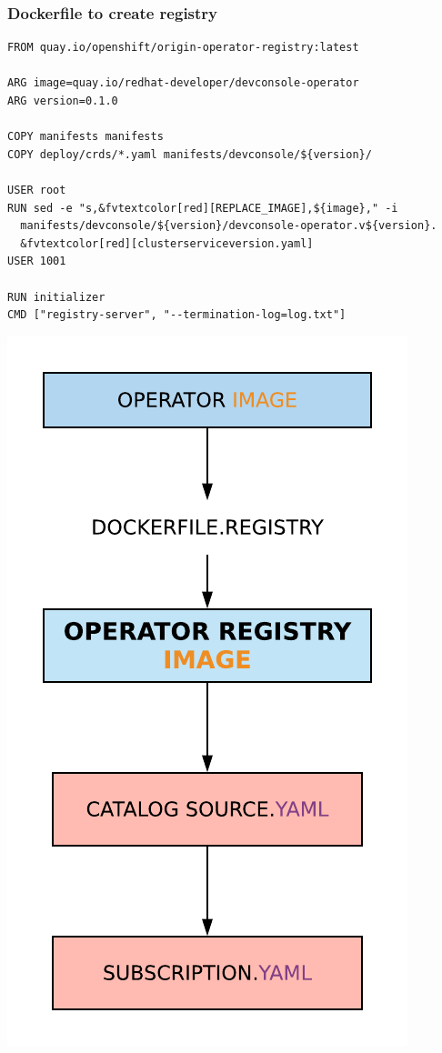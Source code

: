 \documentclass[aspectratio=169]{beamer}
\begin{document}
\begin{frame}[fragile]
  \frametitle{Dockerfile to create registry}

  \begin{Verbatim}[fontsize=\small,commandchars=&\[\]]
FROM quay.io/openshift/origin-operator-registry:latest

ARG image=quay.io/redhat-developer/devconsole-operator
ARG version=0.1.0

COPY manifests manifests
COPY deploy/crds/*.yaml manifests/devconsole/${version}/

USER root
RUN sed -e "s,&fvtextcolor[red][REPLACE_IMAGE],${image}," -i
  manifests/devconsole/${version}/devconsole-operator.v${version}.
  &fvtextcolor[red][clusterserviceversion.yaml]
USER 1001

RUN initializer
CMD ["registry-server", "--termination-log=log.txt"]
  \end{Verbatim}

\end{frame}

\begin{frame}
  \begin{center}
    \includegraphics[scale=.50]{images/operator-registry.png}
  \end{center}
\end{frame}
\end{document}
